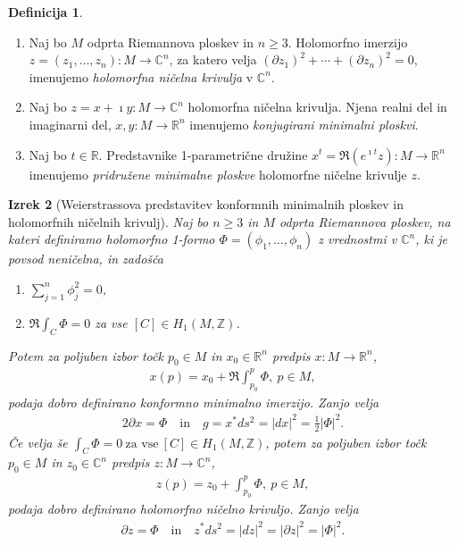 \documentclass[12pt,a4paper,twoside]{article}
\theoremstyle{definition} %
\newtheorem{definicija}{Definicija}[section]
\theoremstyle{plain} %
\newtheorem{izrek}[definicija]{Izrek}
\numberwithin{equation}{section}  %
\newcommand{\R}{\mathbb R}
\newcommand{\Z}{\mathbb Z}
\newcommand{\C}{\mathbb C}
\begin{document}
\begin{definicija}
\begin{enumerate}
\item
Naj bo $M$ odprta Riemannova ploskev in $n \geq 3$. Holomorfno imerzijo $z = (z_{1}, \dots , z_{n}) \colon M \to \C^{n}$, za katero velja
$(\partial{z_{1}})^2 + \cdots + (\partial{z_{n}})^2 = 0$, imenujemo \emph{holomorfna ničelna krivulja} v $\C^{n}$.
\item
Naj bo $z = x + \imath y \colon M \to \C^{n}$ holomorfna ničelna krivulja. Njena realni del in imaginarni del, $x, y \colon M \to \R^{n}$ imenujemo \emph{konjugirani minimalni ploskvi}.
\item
Naj bo $t \in \R$. Predstavnike 1-parametrične družine $x^{t} = \Re{(e^{\imath t} z)} \colon M \to \R^{n}$ imenujemo \emph{pridružene minimalne ploskve} holomorfne ničelne krivulje $z$.
\end{enumerate}
\end{definicija}

\begin{izrek}[Weierstrassova predstavitev konformnih minimalnih ploskev in holomorfnih ničelnih krivulj]
Naj bo $n \geq 3$ in $M$ odprta Riemannova ploskev, na kateri definiramo holomorfno 1-formo $\Phi = (\phi_{1}, \dots , \phi_{n})$ z vrednostmi v $\C^{n}$, ki je povsod neničelna, in zadošča 
\begin{enumerate}
\item $ \sum_{j=1}^{n} \phi_{j}^{2} = 0$,
\item $ \Re \int_{C} \Phi = 0 $ za vse $[C] \in H_{1} (M, \Z)$.
\end{enumerate}
Potem za poljuben izbor točk $p_0 \in M$ in $x_0 \in \R^{n}$ predpis $x \colon M \to \R^{n}$,
\begin{align} \label{eq:Wstrass-kmi}
x(p) = x_0 + \Re \int_{p_0}^{p} \Phi, \ p \in M,
\end{align}
podaja dobro definirano konformno minimalno imerzijo. Zanjo velja
\begin{align}
2 \partial{x} = \Phi \quad \text{in} \quad g = x^{*} ds^2 = |dx|^2 = \frac{1}{2} |\Phi|^2.
\end{align}
%
Če velja še
$ \int_{C} \Phi = 0 \ \text{za vse} \ [C] \in H_{1} (M, \Z) $,
potem za poljuben izbor točk $p_0 \in M$ in $z_0 \in \C^{n}$ predpis $z \colon M \to \C^{n}$,
\begin{align} \label{eq:Wstrass-hnk}
z(p) = z_0 + \int_{p_0}^{p} \Phi, \ p \in M,
\end{align}
podaja dobro definirano holomorfno ničelno krivuljo. Zanjo velja
\begin{align}
\partial{z} = \Phi \quad \text{in} \quad z^{*} ds^2 = |dz|^2 = |\partial{z}|^2 = |\Phi|^2.
\end{align}
\end{izrek}
\end{document}
